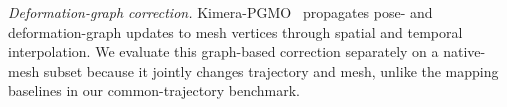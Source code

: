 \noindent\textit{Deformation-graph correction.}
Kimera-PGMO~\cite{kimera_pgmo} propagates pose- and deformation-graph updates to mesh vertices through spatial and temporal interpolation. We evaluate this graph-based correction separately on a native-mesh subset because it jointly changes trajectory and mesh, unlike the mapping baselines in our common-trajectory benchmark.
